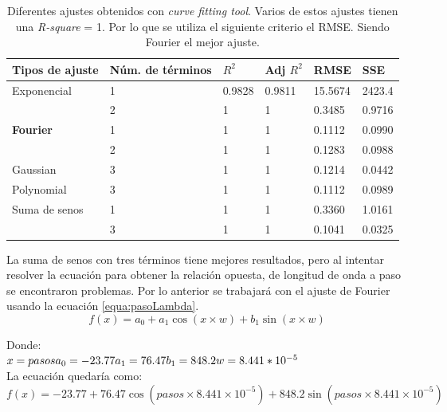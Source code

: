  \begin{table} [h]
\centering
\caption{Diferentes ajustes obtenidos con \textit{curve fitting tool}. Varios de estos ajustes tienen una \textit{R-square} = 1. Por lo que se utiliza el siguiente criterio el RMSE. Siendo Fourier el mejor ajuste.}
\label{tabla:ajustes}
\begin{tabular}{|p{30mm}|p{30mm}|p{10mm}|p{12mm}|p{12mm}|p{12mm}|}
	\hline 
	Tipos de ajuste&Núm. de términos & $R^{2}$ & Adj $R^{2}$& RMSE & SSE \\ 
	\hline 
	Exponencial  & 1 & 0.9828 & 0.9811 & 15.5674 & 2423.4 \\ 
	\hline 
	& 2 & 1& 1 & 0.3485 & 0.9716 \\ 
	\hline 
	\textbf{Fourier} & 1 & 1 & 1 & 0.1112 & 0.0990 \\ 
	\hline 
	& 2 & 1 & 1 & 0.1283 & 0.0988 \\ 
	\hline 
	Gaussian & 3 & 1 & 1 & 0.1214 & 0.0442 \\ 	\hline 
	Polynomial & 3 & 1 & 1 & 0.1112 & 0.0989 \\ 
	\hline 
	Suma de senos & 1 & 1 & 1 & 0.3360 & 1.0161 \\ 
	\hline 
	& 3 & 1 & 1 & 0.1041 & 0.0325 \\ 
	\hline 
\end{tabular} 

\end{table}
La suma de senos con tres términos tiene mejores resultados, pero al intentar resolver la ecuación para obtener la relación opuesta, de longitud de onda a paso se encontraron problemas. Por lo anterior se trabajará con el ajuste de Fourier usando la ecuación \ref{equa:pasoLambda}.
\begin{equation}
f(x) = a_0 + a_1\cos (x\times w) + b_1 \sin(x \times w)
\label{equa:pasoLambda}
\end{equation}

Donde: \\
$x = pasos\\
a_0 =-23.77\\
a_1 = 76.47 \\  %
b_1 = 848.2 \\  %
w = 8.441*10^{-5}$\\  %
La ecuación quedaría como:\\
\begin{equation}
f(x) =-23.77+76.47 \cos(pasos \times8.441\times10^{-5}) +848.2 \sin(pasos \times8.441\times10^{-5})
\label{equa:pasoLambda2}
\end{equation}

